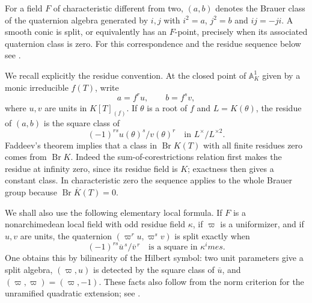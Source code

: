 For a field $F$ of characteristic different from two, $(a,b)$ denotes the
Brauer class of the quaternion algebra generated by $i,j$ with
$i^2=a$, $j^2=b$ and $ij=-ji$.  A smooth conic is split, or equivalently
has an $F$-point, precisely when its associated quaternion class is zero.
For this correspondence and the residue sequence below see
\cite[Theorem~5.1 and Section~6.1]{p2lbBergEtAl2024}.

We recall explicitly the residue convention.  At the closed point of
$\mathbb A^1_K$ given by a monic irreducible $f(T)$, write
\[
 a=f^r u,\qquad b=f^s v,
\]
where $u,v$ are units in $K[T]_{(f)}$.  If $\theta$ is a root of $f$
and $L=K(\theta)$, the residue of $(a,b)$ is the square class of
\[
             (-1)^{rs}u(\theta)^s/v(\theta)^r
             \quad\text{in }L^\times/L^{\times2}.
\]
Faddeev's theorem implies that a class in $\operatorname{Br}K(T)$
with all finite residues zero comes from $\operatorname{Br}K$.
Indeed the sum-of-corestrictions relation first makes the residue at
infinity zero, since its residue field is $K$; exactness then gives a
constant class.  In characteristic zero the sequence applies to the
whole Brauer group because $\operatorname{Br}\overline K(T)=0$.

We shall also use the following elementary local formula.  If $F$ is a
nonarchimedean local field with odd residue field $\kappa$, if $\varpi$
is a uniformizer, and if $u,v$ are units, the quaternion
$(\varpi^r u,\varpi^s v)$ is split exactly when
\[
                    (-1)^{rs}\overline u^{\,s}/\overline v^{\,r}
                    \quad\text{is a square in }\kappa^	imes.
\]
One obtains this by bilinearity of the Hilbert symbol: two unit
parameters give a split algebra, $(\varpi,u)$ is detected by the square
class of $\overline u$, and $(\varpi,\varpi)=(\varpi,-1)$.
These facts also follow from the norm criterion for the unramified
quadratic extension; see \cite[Proposition~5.5]{p2lbVoight2019}.

